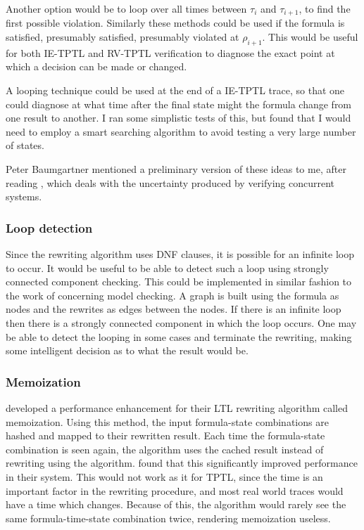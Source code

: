 \documentclass[a4paper]{article}
\begin{document}
Another option would be to loop over all times between $\tau_i$ and $\tau_{i+1}$, to find the first possible violation. Similarly these methods could be used if the formula is satisfied, presumably satisfied, presumably violated at $\rho_{i+1}$. This would be useful for both IE-TPTL and RV-TPTL verification to diagnose the exact point at which a decision can be made or changed.

A looping technique could be used at the end of a IE-TPTL trace, so that one could diagnose at what time after the final state might the formula change from one result to another. I ran some simplistic tests of this, but found that I would need to employ a smart searching algorithm to avoid testing a very large number of states.

Peter Baumgartner mentioned a preliminary version of these ideas to me, after reading \textcite{chai2014fivevalued}, which deals with the uncertainty produced by verifying concurrent systems.

\subsubsection{Loop detection}
Since the rewriting algorithm uses DNF clauses, it is possible for an infinite loop to occur. It would be useful to be able to detect such a loop using strongly connected component checking. This could be implemented in similar fashion to the work of \textcite{lichtenstein1985checking} concerning model checking. A graph is built using the formula as nodes and the rewrites as edges between the nodes. If there is an infinite loop then there is a strongly connected component in which the loop occurs. One may be able to detect the looping in some cases and terminate the rewriting, making some intelligent decision as to what the result would be.

\subsubsection{Memoization}
\textcite[180]{rosu2005rewriting} developed a performance enhancement for their LTL rewriting algorithm called memoization. Using this method, the input formula-state combinations are hashed and mapped to their rewritten result. Each time the formula-state combination is seen again, the algorithm uses the cached result instead of rewriting using the algorithm. \citeauthor{rosu2005rewriting} found that this significantly improved performance in their system. This would not work as it for TPTL, since the time is an important factor in the rewriting procedure, and most real world traces would have a time which changes. Because of this, the algorithm would rarely see the same formula-time-state combination twice, rendering memoization useless.
\end{document}

